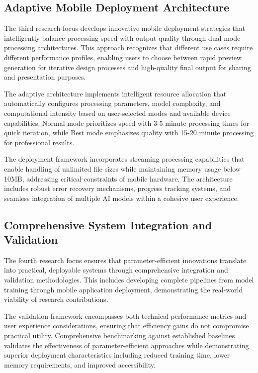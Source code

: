 \documentclass[12pt,a4paper]{report}
\begin{document}
\subsection{Adaptive Mobile Deployment Architecture}

The third research focus develops innovative mobile deployment strategies that intelligently balance processing speed with output quality through dual-mode processing architectures. This approach recognizes that different use cases require different performance profiles, enabling users to choose between rapid preview generation for iterative design processes and high-quality final output for sharing and presentation purposes.

The adaptive architecture implements intelligent resource allocation that automatically configures processing parameters, model complexity, and computational intensity based on user-selected modes and available device capabilities. Normal mode prioritizes speed with 3-5 minute processing times for quick iteration, while Best mode emphasizes quality with 15-20 minute processing for professional results.

The deployment framework incorporates streaming processing capabilities that enable handling of unlimited file sizes while maintaining memory usage below 10MB, addressing critical constraints of mobile hardware. The architecture includes robust error recovery mechanisms, progress tracking systems, and seamless integration of multiple AI models within a cohesive user experience.

\subsection{Comprehensive System Integration and Validation}

The fourth research focus ensures that parameter-efficient innovations translate into practical, deployable systems through comprehensive integration and validation methodologies. This includes developing complete pipelines from model training through mobile application deployment, demonstrating the real-world viability of research contributions.

The validation framework encompasses both technical performance metrics and user experience considerations, ensuring that efficiency gains do not compromise practical utility. Comprehensive benchmarking against established baselines validates the effectiveness of parameter-efficient approaches while demonstrating superior deployment characteristics including reduced training time, lower memory requirements, and improved accessibility.
\end{document}
